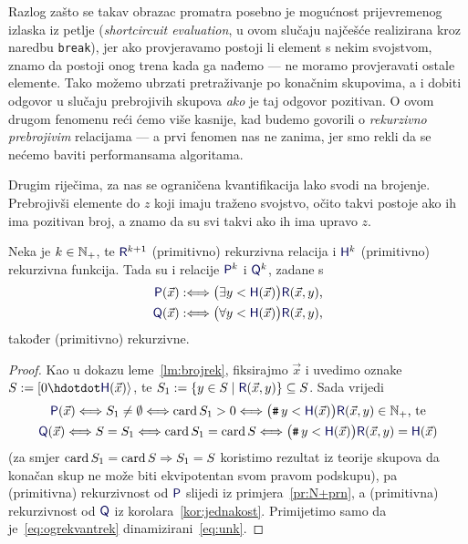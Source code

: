 Razlog zašto se takav obrazac promatra posebno je mogućnost prijevremenog izlaska iz petlje (\emph{shortcircuit evaluation}, u ovom slučaju najčešće realizirana kroz naredbu \texttt{break}), jer ako provjeravamo postoji li element s nekim svojstvom, znamo da postoji onog trena kada ga nađemo --- ne moramo provjeravati ostale elemente. Tako možemo ubrzati pretraživanje po konačnim skupovima, a i dobiti odgovor u slučaju prebrojivih skupova \emph{ako} je taj odgovor pozitivan. O ovom drugom fenomenu reći ćemo više kasnije, kad budemo govorili o \emph{rekurzivno prebrojivim} relacijama --- a prvi fenomen nas ne zanima, jer smo rekli da se nećemo baviti performansama algoritama.

Drugim riječima, za nas se ograničena kvantifikacija lako svodi na brojenje. Prebrojivši elemente do $z$ koji imaju traženo svojstvo, očito takvi postoje ako ih ima pozitivan broj, a znamo da su svi takvi ako ih ima upravo $z$.

\begin{propozicija}[{name=[ograničena kvantifikacija čuva primitivnu rekurzivnost]}]\label{prop:okvantrek}
Neka je $k\in{\mathbb N}_+$, te $\f R^{k+1}$ (primitivno) rekurzivna relacija i $\f H^k$ (primitivno) rekurzivna funkcija. Tada su i relacije $\f P^k$ i $\f Q^k$, zadane s
\begin{align}
    \f P(\vec x):\Longleftrightarrow\bigl(\exists y<\f H(\vec x)\bigr)\f R(\vec x,y)\text,\\
    \f Q(\vec x):\Longleftrightarrow\bigl(\forall y<\f H(\vec x)\bigr)\f R(\vec x,y)\text,
\end{align}
također (primitivno) rekurzivne.
\end{propozicija}
\begin{proof}
    Kao u dokazu leme~\ref{lm:brojrek}, fiksirajmo $\vec x$ i uvedimo oznake $S:=[0\dd \f H(\vec x)\rangle$, te $S_1:=\{y\in S\mid\f R(\vec x,y)\}\subseteq S$. Sada vrijedi
    \begin{gather}
    \label{eq:ogrekvantrek}
        \f P(\vec x)\Longleftrightarrow S_1\ne\emptyset\Longleftrightarrow\card S_1>0\Longleftrightarrow\bigl(\num y<\f H(\vec x)\bigr)\f R(\vec x,y)\in\N_+\text{, te}\\
        \f Q(\vec x)\Longleftrightarrow S=S_1\Longleftrightarrow\card S_1=\card S\Longleftrightarrow\bigl(\num y<\f H(\vec x)\bigr)\f R(\vec x,y)\eq\f H(\vec x)
    \end{gather}
    (za smjer $\operatorname{card} S_1=\operatorname{card} S\Rightarrow S_1=S$ koristimo rezultat iz teorije skupova da konačan skup ne može biti ekvipotentan svom pravom podskupu), pa (primitivna) rekurzivnost od $\f P$ slijedi iz primjera~\ref{pr:N+prn}, a (primitivna) rekurzivnost od $\f Q$ iz korolara~\ref{kor:jednakost}. Primijetimo samo da je~\eqref{eq:ogrekvantrek} dinamizirani~\eqref{eq:unk}.
\end{proof}

